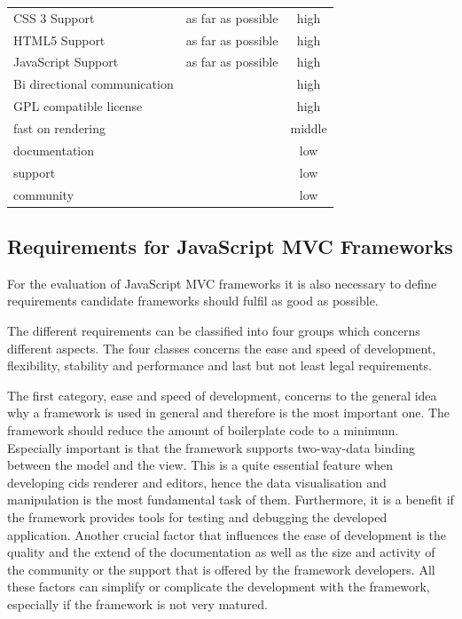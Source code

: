 \begin{minipage}{\linewidth}
\centering
 \label{tab:req_browser_comp}
\begin{tabulary}{\textwidth}{|l|C|c|}
 \hline 
{}
   &  &  \tabularnewline
 \hline
CSS 3 Support & as far as possible & high \\
HTML5 Support & as far as possible & high  \\
JavaScript Support & as far as possible & high \\
 Bi directional communication & & high \\
GPL compatible license & & high \\ \hline
fast on rendering & & middle\\
documentation & & low\\
support & & low \\
community & &low \\
 \hline 
 \end{tabulary}
 \end{minipage}

\subsection{Requirements for JavaScript MVC Frameworks}

For the evaluation of JavaScript MVC frameworks it is also necessary to define requirements candidate frameworks should fulfil as good as possible.

The different requirements can be classified into four groups which concerns different aspects.
The four classes concerns the ease and speed of development, flexibility, stability and performance and last but not least legal requirements.

The first category, ease and speed of development, concerns to the general idea why a framework is used in general and therefore is the most important one.
The framework should reduce the amount of boilerplate code to a minimum.
Especially important is that the framework supports two-way-data binding between the model and the view.
This is a quite essential feature when developing cids renderer and editors, hence the data visualisation and manipulation is the most fundamental task of them.
Furthermore, it is a benefit if the framework provides tools for testing and debugging the developed application.
Another crucial factor that influences the ease of development is the quality and the  extend of the documentation as well as the size and activity of the community or the support that is offered by the framework developers.
All these factors can simplify or complicate the development with the framework, especially if the framework is not very matured.

